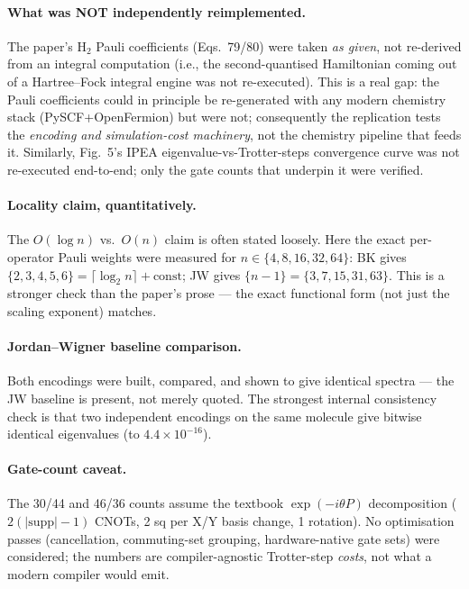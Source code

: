 \documentclass[11pt]{article}
\begin{document}
\paragraph{What was NOT independently reimplemented.} The paper's H$_2$ Pauli
coefficients (Eqs.~79/80) were taken \emph{as given}, not re-derived from an
integral computation (i.e., the second-quantised Hamiltonian coming out of a
Hartree--Fock integral engine was not re-executed). This is a real gap: the
Pauli coefficients could in principle be re-generated with any modern chemistry
stack (PySCF+OpenFermion) but were not; consequently the replication tests the
\emph{encoding and simulation-cost machinery}, not the chemistry pipeline that
feeds it. Similarly, Fig.~5's IPEA eigenvalue-vs-Trotter-steps convergence curve
was not re-executed end-to-end; only the gate counts that underpin it were verified.

\paragraph{Locality claim, quantitatively.} The $O(\log n)$ vs.\ $O(n)$ claim is
often stated loosely. Here the exact per-operator Pauli weights were measured for
$n\in\{4,8,16,32,64\}$: BK gives $\{2,3,4,5,6\}=\lceil\log_2 n\rceil+\text{const}$;
JW gives $\{n{-}1\}=\{3,7,15,31,63\}$. This is a stronger check than the paper's
prose --- the exact functional form (not just the scaling exponent) matches.

\paragraph{Jordan--Wigner baseline comparison.} Both encodings were built,
compared, and shown to give identical spectra --- the JW baseline is present, not
merely quoted. The strongest internal consistency check is that two independent
encodings on the same molecule give bitwise identical eigenvalues (to $4.4\times10^{-16}$).

\paragraph{Gate-count caveat.} The 30/44 and 46/36 counts assume the textbook
$\exp(-i\theta P)$ decomposition ($2(|\text{supp}|{-}1)$ CNOTs, 2 sq per X/Y
basis change, 1 rotation). No optimisation passes (cancellation, commuting-set
grouping, hardware-native gate sets) were considered; the numbers are
compiler-agnostic Trotter-step \emph{costs}, not what a modern compiler would emit.
\end{document}
